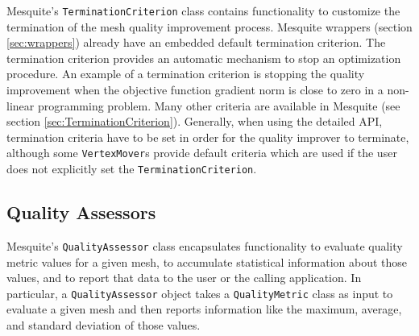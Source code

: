 Mesquite's \texttt{TerminationCriterion} class contains functionality
to customize the termination of the mesh quality improvement process. 
Mesquite wrappers (section \ref{sec:wrappers}) already have an embedded default termination
criterion. The termination criterion provides an automatic mechanism to stop an optimization
procedure. An example of a termination criterion is stopping the quality
improvement when the objective function gradient norm is close
to zero in a non-linear programming problem. Many other criteria are available in Mesquite (see
section \ref{sec:TerminationCriterion}).  Generally, when using the
detailed API, termination criteria have to be set in order for the
quality improver to terminate, although some \texttt{VertexMover}s
provide default criteria which are used if the user does not
explicitly set the \texttt{TerminationCriterion}.
 

\subsection{Quality Assessors}

Mesquite's \texttt{QualityAssessor} class encapsulates functionality to
evaluate quality metric values for a given mesh, to accumulate
statistical information about those values, and to report that data to
the user or the calling application.  In particular, a \texttt{QualityAssessor}
object takes a {\tt QualityMetric} class as input to evaluate a given mesh and then
reports information like the maximum, average, and standard deviation
of those values.


